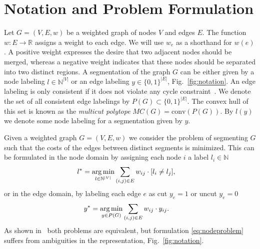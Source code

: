 \section{Notation and Problem Formulation}\label{sec:problem_formulation}
Let $G=(V,E, w)$ be a weighted graph of nodes $V$ and edges $E$.
%
The function $w : E \rightarrow \mathbb{R}$ assigns a weight to each edge.
We will use $w_e$ as a shorthand for $w(e)$.
A positive weight expresses the desire that two adjacent nodes should
be merged, whereas a negative weight indicates
that these nodes should be separated into two distinct regions.
%
%
%
A segmentation of the graph $G$ can be either given by a
node labeling $l \in \mathbb{N}^{|V|}$
or an edge labeling $y \in\{0,1\}^{|E|}$, \cf Fig.~\ref{fig:notation}.
An edge labeling is only consistent if it does not violate any cycle constraint~\cite{chopra_1993_mp}.
We denote the set of all consistent edge labelings by $P(G)\subset\{0,1\}^{|E|}$.
The convex hull of this set is known as the \emph{multicut polytope} $MC(G) = \textrm{conv}(P(G))$.
%
By $l(y)$ we denote some node labeling for a segmentation given by $y$.

Given a weighted graph $G=(V,E,w)$ we consider the problem of segmenting $G$ such that the costs
of the edges between distinct segments is minimized. This can be formulated in the node domain
by assigning each node $i$ a label $l_i \in \mathbb{N}$
\begin{align}
  l^* &= \operatorname*{arg\,min}_{l \in \mathbb{N}^{|V|}} \sum_{ (i,j) \in E } w_{ij} \cdot [l_{i} \neq l_{j}], \label{eq:nodeproblem}
\end{align} 
or in the edge domain, by labeling each edge $e$ as cut $y_e=1$ or uncut $y_e=0$ 
\begin{align}
  y^* &= \argmin_{y \in P(G)} \sum_{ (i,j) \in E } w_{ij} \cdot y_{ij} \label{eq:edgeproblem}.%
\end{align}
As shown in~\cite{kappes_2013_arxiv}  both problems are equivalent, but formulation \ref{eq:nodeproblem}
suffers from ambiguities in the representation, \cf Fig.~\ref{fig:notation}. 

%
